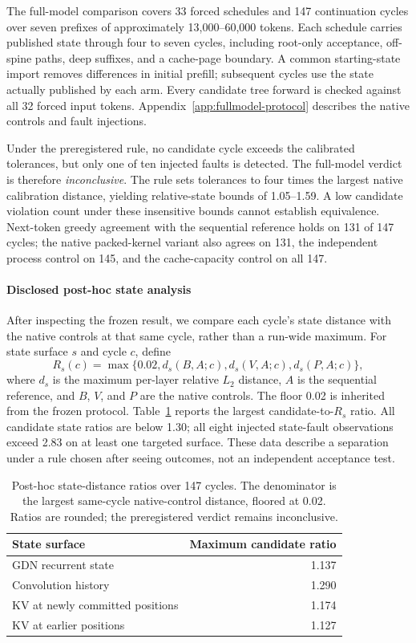 The full-model comparison covers 33 forced schedules and 147 continuation cycles over seven prefixes of approximately 13,000--60,000 tokens. Each schedule carries published state through four to seven cycles, including root-only acceptance, off-spine paths, deep suffixes, and a cache-page boundary. A common starting-state import removes differences in initial prefill; subsequent cycles use the state actually published by each arm. Every candidate tree forward is checked against all 32 forced input tokens. Appendix~\ref{app:fullmodel-protocol} describes the native controls and fault injections.

Under the preregistered rule, no candidate cycle exceeds the calibrated tolerances, but only one of ten injected faults is detected. The full-model verdict is therefore \textit{inconclusive}. The rule sets tolerances to four times the largest native calibration distance, yielding relative-state bounds of 1.05--1.59. A low candidate violation count under these insensitive bounds cannot establish equivalence. Next-token greedy agreement with the sequential reference holds on 131 of 147 cycles; the native packed-kernel variant also agrees on 131, the independent process control on 145, and the cache-capacity control on all 147.

\paragraph{Disclosed post-hoc state analysis}
After inspecting the frozen result, we compare each cycle's state distance with the native controls at that same cycle, rather than a run-wide maximum. For state surface $s$ and cycle $c$, define
\begin{equation}
 R_s(c)=\max\{0.02,d_s(B,A;c),d_s(V,A;c),d_s(P,A;c)\},
\end{equation}
where $d_s$ is the maximum per-layer relative $L_2$ distance, $A$ is the sequential reference, and $B$, $V$, and $P$ are the native controls. The floor 0.02 is inherited from the frozen protocol. Table~\ref{tab:posthoc-state} reports the largest candidate-to-$R_s$ ratio. All candidate state ratios are below 1.30; all eight injected state-fault observations exceed 2.83 on at least one targeted surface. These data describe a separation under a rule chosen after seeing outcomes, not an independent acceptance test.

\begin{table}[t]
\caption{Post-hoc state-distance ratios over 147 cycles. The denominator is the largest same-cycle native-control distance, floored at 0.02. Ratios are rounded; the preregistered verdict remains inconclusive.}
\label{tab:posthoc-state}
\centering\small
\begin{tabular}{@{}lr@{}}
\toprule
State surface & Maximum candidate ratio \\
\midrule
GDN recurrent state & 1.137 \\
Convolution history & 1.290 \\
KV at newly committed positions & 1.174 \\
KV at earlier positions & 1.127 \\
\bottomrule
\end{tabular}
\end{table}

